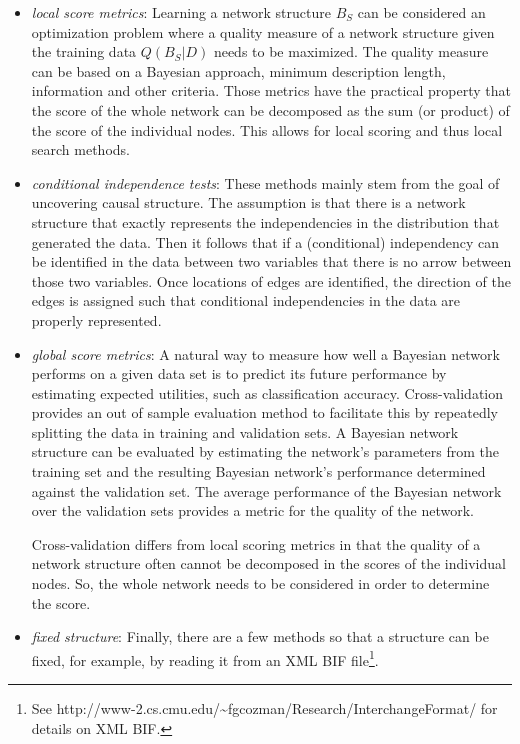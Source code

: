 \documentclass[a4paper]{article}
\begin{document}
\begin{itemize}
\item {\em local score metrics}: 
Learning a network structure $B_S$ can be considered an optimization
problem where a quality measure of a network structure given the
training data $Q(B_S|D)$ needs to be maximized. The quality measure
can be based on a Bayesian approach,  minimum description length,
information and other criteria. Those metrics have the practical property
that the score of the whole network can be decomposed as the sum 
(or product) of the score of the individual nodes. This allows for 
local scoring and thus local search methods.

\item {\em conditional independence tests}:
These methods mainly stem from the goal of uncovering causal structure.
The assumption is that there is a network structure that exactly represents
the independencies in the distribution that generated the data. Then it
follows that if a (conditional) independency can be identified in the data
between two variables that there is no arrow between those two 
variables. Once locations of edges are identified, the direction of the edges
is assigned such that conditional independencies in the data are properly
represented.

\item {\em global score metrics}:
A natural way to measure how well a Bayesian network performs on a
given data set is to predict its future performance by estimating
expected utilities, such as classification accuracy.  Cross-validation
provides an out of sample evaluation method to facilitate this by
repeatedly splitting the data in training and validation sets.  A
Bayesian network structure  can be evaluated by estimating the
network's parameters from the training set and the resulting Bayesian
network's performance determined against the validation set.  The
average performance of the Bayesian network over the validation sets
provides a metric for the quality of the network.

Cross-validation differs from local scoring metrics  in that the quality
of a network structure often cannot be decomposed in the scores of the
individual nodes. So, the whole network needs to be considered in order
to determine the score.

\item {\em fixed structure}:
Finally, there are a few methods so that a structure can be fixed, for
example, by reading it from an XML BIF file\footnote{See {\sf http://www-2.cs.cmu.edu/\~{}fgcozman/Research/InterchangeFormat/}
for details on XML BIF.}.
\end{itemize}
\end{document}
